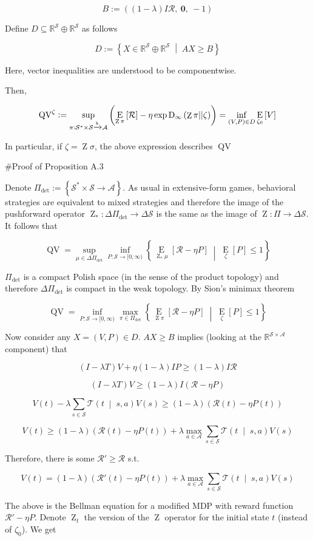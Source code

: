 \documentclass[a4paper]{article}
\newcommand{\AP}[1]{\left(#1\right)}
\newcommand{\AB}[1]{\left[#1\right]}
\newcommand{\AC}[1]{\left\{#1\right\}}
\newcommand{\APM}[2]{\left(#1\;\middle\vert\;#2\right)}
\newcommand{\ACM}[2]{\left\{#1\;\middle\vert\;#2\right\}}
\newcommand{\Ea}[2]{\underset{#1}{\operatorname{E}}\AB{#2}}
\newcommand{\RD}[3]{\operatorname{D}_{#1}\AP{#2\middle\vert\middle\vert#3}}
\newcommand{\Reals}{\mathbb{R}}
\newcommand{\K}{\xrightarrow{\textnormal{k}}}
\newcommand{\A}{\mathcal{A}}
\newcommand{\St}{\mathcal{S}}
\newcommand{\T}{\mathcal{T}}
\newcommand{\R}{\mathcal{R}}
\newcommand{\Pe}{P}
\newcommand{\QV}{\operatorname{QV}}
\DeclareMathOperator{\Z}{Z}
\begin{document}
$$B:=\AP{(1-\lambda)I\R,\ \boldsymbol{0},\ -1}$$

Define $D \subseteq \Reals^\St \oplus \Reals^\St$ as follows

$$D:=\ACM{X \in \Reals^\St \oplus \Reals^\St}{AX \geq B}$$

Here, vector inequalities are understood to be componentwise.

Then,

$$\QV^\zeta := \sup_{\pi: \St^*\times\St \K \A}\AP{\Ea{\Z{\pi}}{\R}-\eta \exp{\RD{\infty}{\Z{\pi}}{\zeta}}} = \inf_{(V,P)\in D}{\Ea{\zeta_0}{V}}$$

In particular, if $\zeta=\Z\sigma$, the above expression describes $\QV$

\#Proof of Proposition A.3

Denote $\Pi_{\det}:=\AC{\St^* \times \St \rightarrow \A}$. As usual in extensive-form games, behavioral strategies are equivalent to mixed strategies and therefore the image of the pushforward operator $\Z_*: \Delta\Pi_{\det} \rightarrow \Delta\St$ is the same as the image of $\Z: \Pi \rightarrow \Delta\St$. It follows that

$$\QV = \sup_{\mu \in \Delta\Pi_{\det}}\inf_{\Pe:\St\rightarrow[0,\infty)}\ACM{\Ea{\Z_*\mu}{\R-\eta\Pe}}{\Ea{\zeta}{\Pe}\leq1}$$

$\Pi_{\det}$ is a compact Polish space (in the sense of the product topology) and therefore $\Delta\Pi_{\det}$ is compact in the weak topology. By Sion's minimax theorem

$$\QV = \inf_{\Pe:\St\rightarrow[0,\infty)}\max_{\pi \in \Pi_{\det}}\ACM{\Ea{\Z\pi}{\R-\eta\Pe}}{\Ea{\zeta}{\Pe}\leq1}$$

Now consider any $X=(V,P) \in D$. $AX \geq B$ implies (looking at the $\Reals^{\St\times\A}$ component) that

$$\AP{I-\lambda T}V + \eta(1-\lambda)IP \geq (1-\lambda)I\R$$

$$\AP{I-\lambda T}V\geq (1-\lambda)I(\R-\eta P)$$

$$V(t) - \lambda \sum_{s \in \St} \T\APM{t}{s,a} V(s) \geq (1-\lambda)\AP{\R(t)-\eta P(t)}$$

$$V(t) \geq (1-\lambda)\AP{\R(t)-\eta P(t)} + \lambda \max_{a \in \A } \sum_{s \in \St} \T\APM{t}{s,a} V(s)$$

Therefore, there is some $\R' \geq \R$ s.t.

$$V(t) = (1-\lambda)\AP{\R'(t)-\eta P(t)} + \lambda \max_{a \in \A } \sum_{s \in \St} \T\APM{t}{s,a} V(s)$$

The above is the Bellman equation for a modified MDP with reward function $\R'-\eta P$. Denote $\Z_t$ the version of the $\Z$ operator for the initial state $t$ (instead of $\zeta_0$). We get
\end{document}
